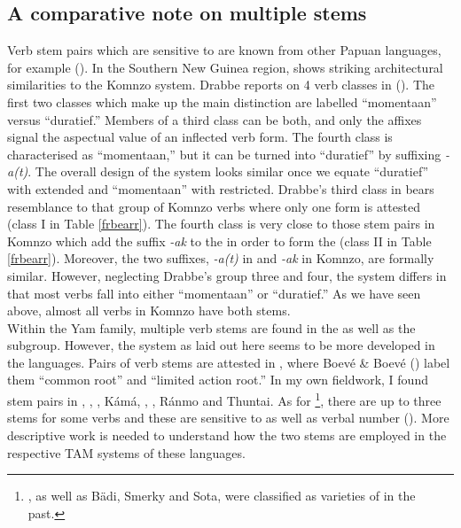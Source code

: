 \subsection{A comparative note on multiple stems} \label{comparativenoteextrs}

Verb stem pairs which are sensitive to  are known from other Papuan languages, for example  (\citealt[245]{Fedden:2011wu}). In the Southern New Guinea region,  shows striking architectural similarities to the Komnzo system. Drabbe reports on 4 verb classes in  (\citeyear[31]{Drabbe:1955tm}). The first two classes which make up the main distinction are labelled ``momentaan'' versus ``duratief.'' Members of a third class can be both, and only the affixes signal the aspectual value of an inflected verb form. The fourth class is characterised as ``momentaan,'' but it can be turned into ``duratief'' by suffixing \emph{-a(t)}. The overall design of the  system looks similar once we equate ``duratief'' with extended and ``momentaan'' with restricted. Drabbe's third class in  bears resemblance to that group of Komnzo verbs where only one form is attested (class I in Table \ref{frbearr}). The fourth class is very close to those stem pairs in Komnzo which add the suffix \emph{-ak} to the  in order to form the  (class II in Table \ref{frbearr}). Moreover, the two suffixes, \emph{-a(t)} in  and \emph{-ak} in Komnzo, are formally similar. However, neglecting Drabbe's group three and four, the  system differs in that most verbs fall into either ``momentaan'' or ``duratief.'' As we have seen above, almost all verbs in Komnzo have both stems.\\

Within the Yam family, multiple verb stems are found in the  as well as the  subgroup. However, the system as laid out here seems to be more developed in the  languages. Pairs of verb stems are attested in , where Boevé \& Boevé (\citeyear{Bouve:2003ar}) label them ``common root'' and ``limited action root.'' In my own fieldwork, I found stem pairs in , , , Kámá, , , Ránmo and  Thuntai. As for \footnote{, as well as Bädi, Smerky and Sota, were classified as varieties of  in the past.}, there are up to three stems for some verbs and these are sensitive to  as well as verbal number (\citealt{Carroll:Ngkolmpu}). More descriptive work is needed to understand how the two stems are employed in the respective TAM systems of these languages.\\

